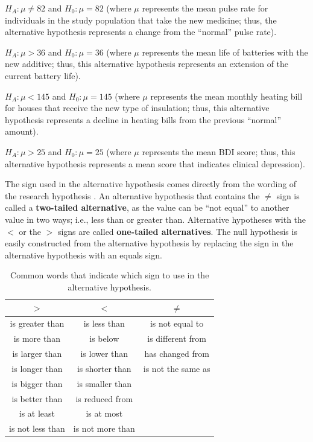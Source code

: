 \documentclass[10pt,openany]{book}\usepackage[]{graphicx}\usepackage[]{color}
\begin{document}
\vspace*{-8pt}
\begin{Enumerate}
  \item $H_{A}:\mu\neq82$ and $H_{0}:\mu=82$ (where $\mu$ represents the mean pulse rate for individuals in the study population that take the new medicine; thus, the alternative hypothesis represents a change from the ``normal'' pulse rate).
 \item $H_{A}:\mu>36$ and $H_{0}:\mu=36$ (where $\mu$ represents the mean life of batteries with the new additive; thus, this alternative hypothesis represents an extension of the current battery life).
  \item $H_{A}:\mu<145$ and $H_{0}:\mu=145$ (where $\mu$ represents the mean monthly heating bill for houses that receive the new type of insulation; thus, this alternative hypothesis represents a decline in heating bills from the previous ``normal'' amount).
 \item $H_{A}:\mu>25$ and $H_{0}:\mu=25$ (where $\mu$ represents the mean BDI score; thus, this alternative hypothesis represents a mean score that indicates clinical depression).
\end{Enumerate}
\vspace*{-8pt}

The sign used in the alternative hypothesis comes directly from the wording of the research hypothesis . An alternative hypothesis that contains the $\neq$ sign is called a \textbf{two-tailed alternative}, as the value can be ``not equal'' to another value in two ways; i.e., less than or greater than. Alternative hypotheses with the $<$ or the $>$ signs are called \textbf{one-tailed alternatives}. The null hypothesis is easily constructed from the alternative hypothesis by replacing the sign in the alternative hypothesis with an equals sign.

\begin{table}[htbp]
  \caption{Common words that indicate which sign to use in the alternative hypothesis.}
  \label{tab:HAwords}
  \centering
  \begin{tabular}{ccc}
\hline\hline
$>$ & $<$ & $\neq$ \\
\hline
is greater than & is less than & is not equal to \\
is more than & is below & is different from \\
is larger than & is lower than & has changed from \\
is longer than & is shorter than & is not the same as \\
is bigger than & is smaller than &  \\
is better than & is reduced from &  \\
is at least & is at most &  \\
is not less than & is not more than &  \\
\hline\hline
  \end{tabular}
\end{table}
\end{document}
